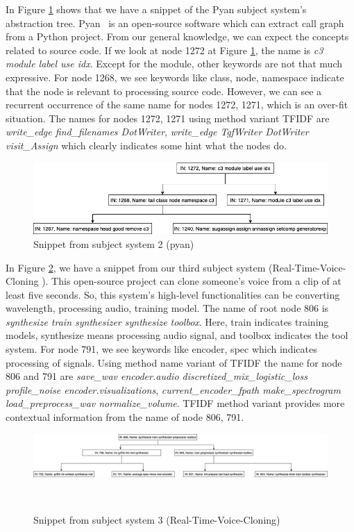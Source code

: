 In Figure \ref{fig:rq1_pyan1} shows that we have a snippet of the Pyan subject system's abstraction tree. Pyan~\cite{pyan} is an open-source software which can extract call graph from a Python project. From our general knowledge, we can expect the concepts related to source code. If we look at node 1272 at Figure \ref{fig:rq1_pyan1}, the name is \textit{c3 module label use idx}. Except for the module, other keywords are not that much expressive. For node 1268, we see keywords like class, node, namespace indicate that the node is relevant to processing source code. However, we can see a recurrent occurrence of the same name for nodes 1272, 1271, which is an over-fit situation. The names for nodes 1272, 1271 using method variant TFIDF are \textit{write\_edge  find\_filenames  DotWriter}, \textit{write\_edge TgfWriter DotWriter visit\_Assign}  which clearly indicates some hint what the nodes do. 
\begin{figure}[h]
  \centering
  \includegraphics[width=\columnwidth]{figures/hla2/rq1_pyan1.png}
  \caption{Snippet from subject system 2 (pyan)}
  \label{fig:rq1_pyan1}
\end{figure}

In Figure \ref{fig:rq1_realTime1}, we have a snippet from our third subject system (Real-Time-Voice-Cloning \cite{realTime}). This open-source project can clone someone's voice from a clip of at least five seconds. So, this system's high-level functionalities can be converting wavelength, processing audio, training model. The name of root node 806 is \textit{synthesize train synthesizer synthesize toolbox}. Here, train indicates training models, synthesize means processing audio signal, and toolbox indicates the tool system. For node 791, we see keywords like encoder, spec which indicates processing of signals. Using method name variant of TFIDF the name for node 806 and 791 are \textit{save\_wav encoder.audio discretized\_mix\_logistic\_loss profile\_noise encoder.visualizations}, \textit{current\_encoder\_fpath make\_spectrogram load\_preprocess\_wav normalize\_volume}. TFIDF method variant provides more contextual information from the name of node 806, 791. 

\begin{figure}[h]
  \centering
  \includegraphics[width=\columnwidth]{figures/hla2/rq1_realTime1.png}
  \caption{Snippet from subject system 3 (Real-Time-Voice-Cloning)}~\label{fig:rq1_realTime1}
\end{figure}


